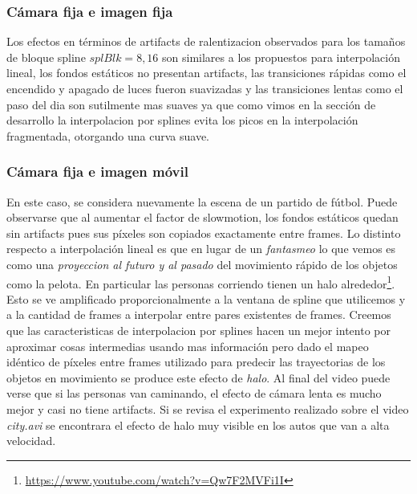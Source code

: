 \subsubsection*{Cámara fija e imagen fija}
Los efectos en términos de artifacts de ralentizacion observados para los tamaños de bloque spline $splBlk = 8, 16$ son similares a los propuestos para interpolación lineal, los fondos estáticos no presentan artifacts, las transiciones rápidas como el encendido y apagado de luces fueron suavizadas y las transiciones lentas como el paso del dia son sutilmente mas suaves ya que como vimos en la sección de desarrollo la interpolacion por splines evita los picos en la interpolación fragmentada, otorgando una curva suave.

\subsubsection*{Cámara fija e imagen móvil}
En este caso, se considera nuevamente la escena de un partido de fútbol. Puede observarse que al aumentar el factor de slowmotion, los fondos estáticos quedan sin artifacts pues sus píxeles son copiados exactamente entre frames. Lo distinto respecto a interpolación lineal es que en lugar de un \emph{fantasmeo} lo que vemos es como una \emph{proyeccion al futuro y al pasado} del movimiento rápido de los objetos como la pelota. En particular las personas corriendo tienen un halo alrededor\footnote{\url{https://www.youtube.com/watch?v=Qw7F2MVFi1I}}. Esto se ve amplificado proporcionalmente a la ventana de spline que utilicemos y a la cantidad de frames a interpolar entre pares existentes de frames. Creemos que las caracteristicas de interpolacion por splines hacen un mejor intento por aproximar cosas intermedias usando mas información pero dado el mapeo idéntico de píxeles entre frames utilizado para predecir las trayectorias de los objetos en movimiento se produce este efecto de \emph{halo}. Al final del video puede verse que si las personas van caminando, el efecto de cámara lenta es mucho mejor y casi no tiene artifacts.
Si se revisa el experimento realizado sobre el video \emph{city.avi} se encontrara el efecto de halo muy visible en los autos que van a alta velocidad. 

